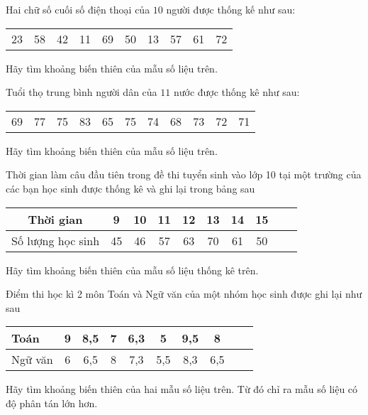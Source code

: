 \baitaptl
\begin{bt}%
	Hai chữ số cuối số điện thoại của $ 10 $ người được thống kế như sau:
	\begin{longtable}{cccccccccc}
		23 & 58 & 42 & 11 & 69 & 50 & 13 & 57 & 61 & 72
	\end{longtable}
	Hãy tìm khoảng biến thiên của mẫu số liệu trên.
\end{bt}

\begin{bt}%
	Tuổi thọ trung bình người dân của $ 11 $ nước được thống kê như sau:
	\begin{longtable}{ccccccccccc}
		69 & 77 & 75 & 83 & 65 & 75 & 74 & 68 & 73 & 72 & 71
	\end{longtable}
	Hãy tìm khoảng biến thiên của mẫu số liệu trên.
\end{bt}

\begin{bt}%
	Thời gian làm câu đầu tiên trong đề thi tuyển sinh vào lớp 10 tại một trường của các bạn học sinh được thống kê và ghi lại trong bảng sau
	\begin{longtable}{|c|c|c|c|c|c|c|c|c|c|}
		\hline 
		Thời gian & 9 & 10 & 11 & 12 & 13 & 14 & 15 \\ 
		\hline 
		Số lượng học sinh & 45 & 46 & 57 & 63 & 70 & 61 & 50 \\ 
		\hline 
	\end{longtable}
	Hãy tìm khoảng biến thiên của mẫu số liệu thống kê trên.
\end{bt}

\begin{bt}%
	Điểm thi học kì 2 môn Toán và Ngữ văn của một nhóm học sinh được ghi lại như sau
	\begin{longtable}{|l|c|c|c|c|c|c|c|c|c|}
		\hline 
		Toán & 9 & 8{,}5 & 7 & 6{,}3 & 5 & 9{,}5 & 8 \\ 
		\hline 
		Ngữ văn & 6 & 6{,}5 & 8 & 7{,}3 & 5{,}5 & 8{,}3 & 6{,}5 \\ 
		\hline 
	\end{longtable}
	Hãy tìm khoảng biến thiên của hai mẫu số liệu trên. Từ đó chỉ ra mẫu số liệu có độ phân tán lớn hơn.
\end{bt}

